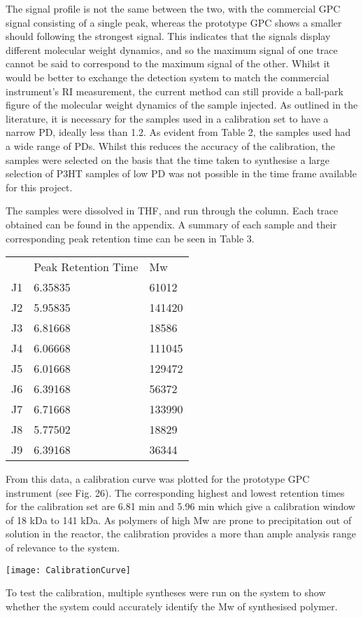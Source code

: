 The signal profile is not the same between the two, with the commercial GPC signal consisting of a single peak, whereas the prototype GPC shows a smaller should following the strongest signal. This indicates that the signals display different molecular weight dynamics, and so the maximum signal of one trace cannot be said to correspond to the maximum signal of the other. Whilst it would be better to exchange the detection system to match the commercial instrument’s RI measurement, the current method can still provide a ball-park figure of the molecular weight dynamics of the sample injected.  As outlined in the literature, it is necessary for the samples used in a calibration set to have a narrow PD, ideally less than 1.2. As evident from Table 2, the samples used had a wide range of PDs. Whilst this reduces the accuracy of the calibration, the samples were selected on the basis that the time taken to synthesise a large selection of P3HT samples of low PD was not possible in the time frame available for this project.

The samples were dissolved in THF, and run through the column. Each trace obtained can be found in the appendix. A summary of each sample and their corresponding peak retention time can be seen in Table 3. 

\begin{table}[]
	\begin{tabular}{lll}
		& Peak Retention Time & Mw     \\
		J1 & 6.35835             & 61012  \\
		J2 & 5.95835             & 141420 \\
		J3 & 6.81668             & 18586  \\
		J4 & 6.06668             & 111045 \\
		J5 & 6.01668             & 129472 \\
		J6 & 6.39168             & 56372  \\
		J7 & 6.71668             & 133990 \\
		J8 & 5.77502             & 18829  \\
		J9 & 6.39168             & 36344 
	\end{tabular}
\end{table}

From this data, a calibration curve was plotted for the prototype GPC instrument (see Fig. 26). The corresponding highest and lowest retention times for the calibration set are 6.81 min and 5.96 min which give a calibration window of 18 kDa to 141 kDa. As polymers of high Mw are prone to precipitation out of solution in the reactor, the calibration provides a more than ample analysis range of relevance to the system.

\texttt{[image: CalibrationCurve]}

To test the calibration, multiple syntheses were run on the system to show whether the system could accurately identify the Mw of synthesised polymer. 




